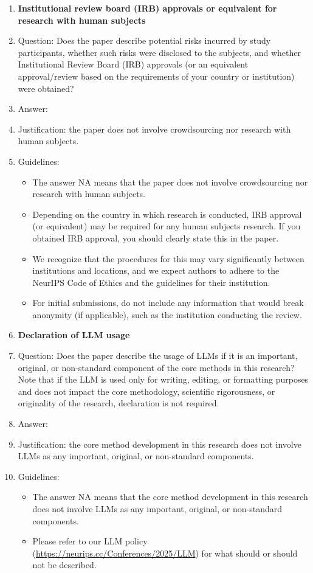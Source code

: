 \documentclass{article}
\theoremstyle{plain}
\theoremstyle{definition}
\theoremstyle{remark}
\begin{document}
\begin{enumerate}
\item {\bf Institutional review board (IRB) approvals or equivalent for research with human subjects}
    \item[] Question: Does the paper describe potential risks incurred by study participants, whether such risks were disclosed to the subjects, and whether Institutional Review Board (IRB) approvals (or an equivalent approval/review based on the requirements of your country or institution) were obtained?
    \item[] Answer: \answerNA{} %
    \item[] Justification: the paper does not involve crowdsourcing nor research with human subjects.
    \item[] Guidelines:
    \begin{itemize}
        \item The answer NA means that the paper does not involve crowdsourcing nor research with human subjects.
        \item Depending on the country in which research is conducted, IRB approval (or equivalent) may be required for any human subjects research. If you obtained IRB approval, you should clearly state this in the paper. 
        \item We recognize that the procedures for this may vary significantly between institutions and locations, and we expect authors to adhere to the NeurIPS Code of Ethics and the guidelines for their institution. 
        \item For initial submissions, do not include any information that would break anonymity (if applicable), such as the institution conducting the review.
    \end{itemize}

\item {\bf Declaration of LLM usage}
    \item[] Question: Does the paper describe the usage of LLMs if it is an important, original, or non-standard component of the core methods in this research? Note that if the LLM is used only for writing, editing, or formatting purposes and does not impact the core methodology, scientific rigorousness, or originality of the research, declaration is not required.
    \item[] Answer: \answerNA{} %
    \item[] Justification: the core method development in this research does not involve LLMs as any important, original, or non-standard components.
    \item[] Guidelines:
    \begin{itemize}
        \item The answer NA means that the core method development in this research does not involve LLMs as any important, original, or non-standard components.
        \item Please refer to our LLM policy (\url{https://neurips.cc/Conferences/2025/LLM}) for what should or should not be described.
    \end{itemize}

\end{enumerate}
\end{document}
